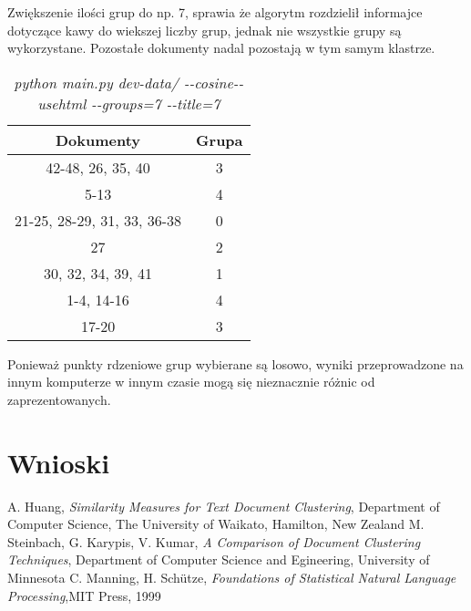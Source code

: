 \documentclass{article}
\begin{document}
Zwiększenie ilości grup do np. 7, sprawia że algorytm rozdzielił informajce dotyczące kawy do wiekszej liczby grup, jednak nie wszystkie grupy są wykorzystane. Pozostałe dokumenty nadal pozostają w tym samym klastrze.

\begin{table}[h]
\begin{center}
\begin{tabular}{ | c | c | }
\hline
Dokumenty & Grupa \\ \hline
42-48, 26, 35, 40 & 3 \\ \hline
5-13 & 4 \\ \hline
21-25, 28-29, 31, 33, 36-38 & 0 \\ \hline
27 & 2 \\ \hline
30, 32, 34, 39, 41 & 1 \\ \hline
1-4, 14-16 & 4 \\ \hline
17-20 & 3 \\ \hline
\end{tabular}
\caption{\emph{python main.py dev-data/ -{}-cosine-{}-usehtml -{}-groups=7 -{}-title=7}}
\end{center}
\end{table}

Ponieważ punkty rdzeniowe grup wybierane są losowo, wyniki przeprowadzone na innym komputerze w innym czasie mogą się nieznacznie różnic od zaprezentowanych.

\section{Wnioski}

\begin{thebibliography}{9}
A. Huang, \emph{Similarity Measures for Text Document Clustering}, Department of Computer Science, The University of Waikato, Hamilton, New Zealand
M. Steinbach, G. Karypis, V. Kumar, \emph{A Comparison of Document Clustering Techniques}, Department of Computer Science and Egineering, University of Minnesota
C. Manning, H. Schütze, \emph{Foundations of Statistical Natural Language Processing},MIT Press, 1999
\end{thebibliography}
\end{document}
